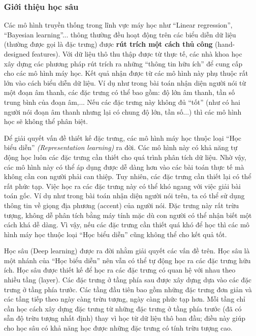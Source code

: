 \subsubsection*{Giới thiệu học sâu}
	Các mô hình truyền thống trong lĩnh vực máy học như ``Linear regression'', ``Bayesian learning''... thông thường đều hoạt động trên các biểu diễn dữ liệu (thường được gọi là đặc trưng) được \textbf{rút trích một cách thủ công} (hand-designed features).
	Với dữ liệu thô thu thập được từ thực tế, các nhà khoa học xây dựng các phương pháp rút trích ra những ``thông tin hữu ích'' để cung cấp cho các mô hình máy học.
	Kết quả nhận được từ các mô hình này phụ thuộc rất lớn vào cách biểu diễn dữ liệu.
	Ví dụ như trong bài toán nhận diện người nói từ một đoạn âm thanh, các đặc trưng có thể bao gồm: độ lớn âm thanh, tần số trung bình của đoạn âm,...
	Nếu các đặc trưng này không đủ ``tốt'' (như có hai người nói đoạn âm thanh nhưng lại có chung độ lớn, tần số...) thì các mô hình học sẽ không thể phân biệt.
		
	Để giải quyết vấn đề thiết kế đặc trưng, các mô hình máy học thuộc loại ``Học biểu diễn'' \textit{(Representation learning)} ra đời.
	Các mô hình này có khả năng tự động học luôn các đặc trưng cần thiết cho quá trình phân tích dữ liệu.
	Nhờ vậy, các mô hình này có thể áp dụng được dễ dàng hơn vào các bài toán thực tế mà không cần con người phải can thiệp.
	Tuy nhiên, các đặc trưng cần thiết lại có thể rất phức tạp.
	Việc học ra các đặc trưng này có thể khó ngang với việc giải bài toán gốc.
	Ví dụ như trong bài toán nhận diện người nói trên, ta có thể sử dụng thông tin về giọng địa phương (accent) của người nói.
	Đặc trưng này rất trừu tượng, không dễ phân tích bằng máy tính mặc dù con người có thể nhận biết một cách khá dễ dàng.
	Vì vậy, nếu các đặc trưng cần thiết quá khó để học thì các mô hình máy học thuộc loại ``Học biểu diễn'' cũng không thể cho kết quả tốt.

	Học sâu (Deep learning) được ra đời nhằm giải quyết các vấn đề trên.
	Học sâu là một nhánh của ``Học biểu diễn'' nên vẫn có thể tự động học ra các đặc trưng hữu ích.
	Học sâu được thiết kế để học ra các đặc trưng có quan hệ với nhau theo nhiều tầng (layer).
	Các đặc trưng ở tầng phía sau được xây dựng dựa vào các đặc trưng ở tầng phía trước.
	Các tầng đầu tiên bao gồm những đặc trưng đơn giản và các tầng tiếp theo ngày càng trừu tượng, ngày càng phức tạp hơn.
	Mỗi tầng chỉ cần học cách xây dựng đặc trưng từ những đặc trưng ở tầng phía trước (đã có sẵn độ trừu tượng nhất định) thay vì học từ dữ liệu thô ban đầu; điều này giúp cho học sâu có khả năng học được những đặc trưng có tính trừu tượng cao.
	
